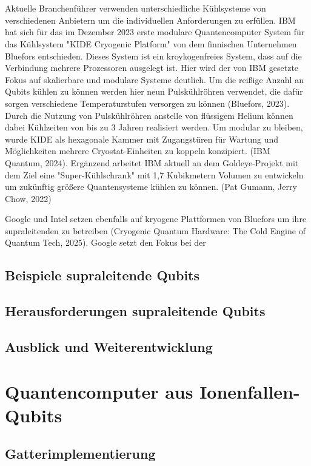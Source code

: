 \\\\
Aktuelle Branchenführer verwenden unterschiedliche Kühlsysteme von verschiedenen Anbietern um die individuellen Anforderungen zu erfüllen. IBM hat sich für das im Dezember 2023 erste modulare Quantencomputer System für das Kühlsystem "KIDE Cryogenic Platform" von dem finnischen Unternehmen Bluefors entschieden. Dieses System ist ein kroykogenfreies System, dass auf die Verbindung mehrere Prozessoren ausgelegt ist. Hier wird der von IBM gesetzte Fokus auf skalierbare und modulare Systeme deutlich. Um die reißige Anzahl an Qubits kühlen zu können werden hier neun Pulskühlröhren verwendet, die dafür sorgen verschiedene Temperaturstufen versorgen zu können (Bluefors, 2023). Durch die Nutzung von Pulskühlröhren anstelle von flüssigem Helium können dabei Kühlzeiten von bis zu 3 Jahren realisiert werden. Um modular zu bleiben, wurde KIDE als hexagonale Kammer mit Zugangstüren für Wartung und Möglichkeiten mehrere Cryostat-Einheiten zu koppeln konzipiert. (IBM Quantum, 2024). Ergänzend arbeitet IBM aktuell an dem Goldeye-Projekt mit dem Ziel eine "Super-Kühlschrank" mit 1,7 Kubikmetern Volumen zu entwickeln um zukünftig größere Quantensysteme kühlen zu können. (Pat Gumann, Jerry Chow, 2022) \cite{gumann_ibm_2022}

Google und Intel setzen ebenfalls auf kryogene Plattformen von Bluefors um ihre supraleitenden zu betreiben (Cryogenic Quantum Hardware: The Cold Engine of Quantum Tech, 2025). Google setzt den Fokus bei der 


\subsection{Beispiele supraleitende Qubits}
\subsection{Herausforderungen supraleitende Qubits}
\subsection{Ausblick und Weiterentwicklung}

\section{Quantencomputer aus Ionenfallen-Qubits}
\subsection{Gatterimplementierung}

